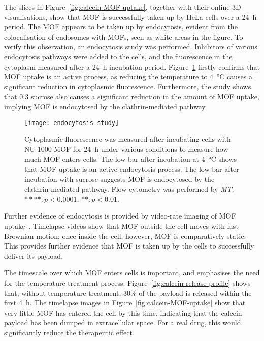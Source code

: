 The slices in Figure~\ref{fig:calcein-MOF-uptake}, together with their online 3D visualisations, show that MOF is successfully taken up by HeLa cells over a \SI{24}{\hour} period.
The MOF appears to be taken up by endocytosis, evident from the colocalisation of endosomes with MOFs, seen as white areas in the figure.
To verify this observation, an endocytosis study was performed.
Inhibitors of various endocytosis pathways were added to the cells, and the fluorescence in the cytoplasm measured after a \SI{24}{\hour} incubation period.
Figure~\ref{fig:endocytosis-study} firstly confirms that MOF uptake is an active process, as reducing the temperature to \SI{4}{\degreeCelsius} causes a significant reduction in cytoplasmic fluorescence.
Furthermore, the study shows that \SI{0.3}{\Molar} sucrose also causes a significant reduction in the amount of MOF uptake, implying MOF is endocytosed by the clathrin-mediated pathway.

\begin{figure}[b!]
\centering
\texttt{[image: endocytosis-study]}
\caption[MOFs: An endocytosis study shows NU-1000 MOF is taken up by HeLa cells through the clathrin-mediated pathway]{Cytoplasmic fluorescence was measured after incubating cells with NU-1000 MOF for \SI{24}{\hour} under various conditions to measure how much MOF enters cells. The low bar after incubation at \SI{4}{\degreeCelsius} shows that MOF uptake is an active endocytosis process. The low bar after incubation with sucrose suggests MOF is endocytosed by the clathrin-mediated pathway. Flow cytometry was performed by \textit{MT}. $****: p<0.0001$, $**: p<0.01$. }
\label{fig:endocytosis-study}
\end{figure}

Further evidence of endocytosis is provided by video-rate imaging of MOF uptake~\cite{teplensky2017temperature}.
Timelapse videos show that MOF outside the cell moves with fast Brownian motion; once inside the cell, however, MOF is comparatively static.
This provides further evidence that MOF is taken up by the cells to successfully deliver its payload.

The timescale over which MOF enters cells is important, and emphasises the need for the temperature treatment process.
Figure~\ref{fig:calcein-release-profile} shows that, without temperature treatment, 30\% of the payload is released within the first \SI{4}{\hour}.
The timelapse images in Figure~\ref{fig:calcein-MOF-uptake} show that very little MOF has entered the cell by this time, indicating that the calcein payload has been dumped in extracellular space.
For a real drug, this would significantly reduce the therapeutic effect.


